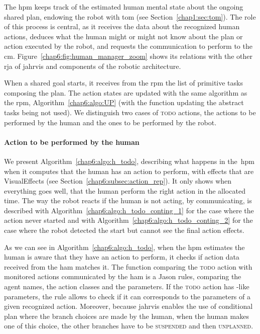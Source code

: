 \documentclass[a4paper,11pt,twoside]{StyleThese}
\begin{document}
The \acrfull{hpm} keeps track of the estimated human mental state about the ongoing shared plan, endowing the robot with \acrlong{tom} (see Section~\ref{chap1:sec:tom}). The role of this process is central, as it receives the data about the recognized human actions, deduces what the human might or might not know about the plan or action executed by the robot, and requests the communication to perform to the \acrfull{cm}. Figure~\ref{chap6:fig:human_manager_zoom} shows its relations with the other \acrshort{rja} of \acrshort{jahrvis} and components of the robotic architecture.

When a shared goal starts, it receives from the \acrshort{rpm} the list of primitive tasks composing the plan. The action states are updated with the same algorithm as the \acrshort{rpm}, Algorithm~\ref{chap6:algo:UP} (with the function updating the abstract tasks being not used). We distinguish two cases of \textsc{todo} actions, the actions to be performed by the human and the ones to be performed by the robot.

\paragraph{Action to be performed by the human} We present Algorithm~\ref{chap6:algo:h_todo}, describing what happens in the~\acrshort{hpm} when it computes that the human has an action to perform, with effects that are VisualEffects (see Section~\ref{chap6:subsec:action_rep}). It only shows when everything goes well, \ie that the human perform the right action in the allocated time. The way the robot reacts if the human is not acting, by communicating, is described with Algorithm~\ref{chap6:algo:h_todo_conting_1} for the case where the action never started and with Algorithm~\ref{chap6:algo:h_todo_conting_2} for the case where the robot detected the start but cannot see the final action effects.

As we can see in Algorithm~\ref{chap6:algo:h_todo}, when the \acrshort{hpm} estimates the human is aware that they have an action to perform, it checks if action data received from the \acrlong{ham} matches it. The function comparing the \textsc{todo} action with monitored actions communicated by the \acrshort{ham} is a Jason rules, comparing the agent names, the action classes and the parameters. If the \textsc{todo} action has \sparql-like parameters, the rule allows to check if it can corresponds to the parameters of a given recognized action. Moreover, because \acrshort{jahrvis} enables the use of conditional plan where the branch choices are made by the human, when the human makes one of this choice, the other branches have to be \textsc{suspended} and then \textsc{unplanned}.
\end{document}
